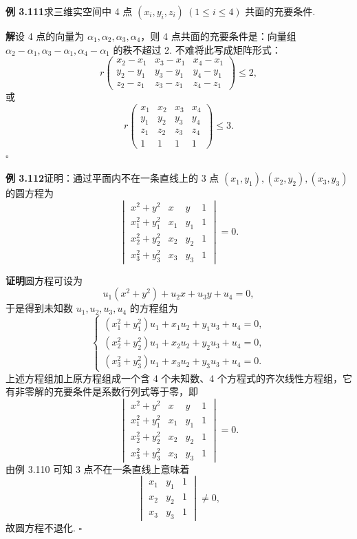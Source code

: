 \documentclass[UTF8, 12pt, fontset=fandol, oneside]{ctexart}
\begin{document}
\noindent\textbf{例 3.111}\quad 求三维实空间中 4 点 $(x_i,y_i,z_i)\ (1\le i\le 4)$ 共面的充要条件.

\noindent\textbf{解}\quad 设 4 点的向量为 $\alpha_1,\alpha_2,\alpha_3,\alpha_4$，则 4 点共面的充要条件是：向量组 $\alpha_2-\alpha_1,\alpha_3-\alpha_1,\alpha_4-\alpha_1$ 的秩不超过 2. 不难将此写成矩阵形式：
\[
r\begin{pmatrix}
x_2-x_1&x_3-x_1&x_4-x_1\\
y_2-y_1&y_3-y_1&y_4-y_1\\
z_2-z_1&z_3-z_1&z_4-z_1
\end{pmatrix}\le 2,
\]
或
\[
r\begin{pmatrix}
x_1&x_2&x_3&x_4\\
y_1&y_2&y_3&y_4\\
z_1&z_2&z_3&z_4\\
1&1&1&1
\end{pmatrix}\le 3.
\]
$\square$

\noindent\textbf{例 3.112}\quad 证明：通过平面内不在一条直线上的 3 点 $(x_1,y_1),(x_2,y_2),(x_3,y_3)$ 的圆方程为
\[
\begin{vmatrix}
x^2+y^2&x&y&1\\
x_1^2+y_1^2&x_1&y_1&1\\
x_2^2+y_2^2&x_2&y_2&1\\
x_3^2+y_3^2&x_3&y_3&1
\end{vmatrix}=0.
\]

\noindent\textbf{证明}\quad 圆方程可设为
\[
u_1(x^2+y^2)+u_2x+u_3y+u_4=0,
\]
于是得到未知数 $u_1,u_2,u_3,u_4$ 的方程组为
\[
\begin{cases}
(x_1^2+y_1^2)u_1+x_1u_2+y_1u_3+u_4=0,\\
(x_2^2+y_2^2)u_1+x_2u_2+y_2u_3+u_4=0,\\
(x_3^2+y_3^2)u_1+x_3u_2+y_3u_3+u_4=0.
\end{cases}
\]
上述方程组加上原方程组成一个含 4 个未知数、4 个方程式的齐次线性方程组，它有非零解的充要条件是系数行列式等于零，即
\[
\begin{vmatrix}
x^2+y^2&x&y&1\\
x_1^2+y_1^2&x_1&y_1&1\\
x_2^2+y_2^2&x_2&y_2&1\\
x_3^2+y_3^2&x_3&y_3&1
\end{vmatrix}=0.
\]
由例 3.110 可知 3 点不在一条直线上意味着
\[
\begin{vmatrix}
x_1&y_1&1\\
x_2&y_2&1\\
x_3&y_3&1
\end{vmatrix}\ne 0,
\]
故圆方程不退化. $\square$
\end{document}
